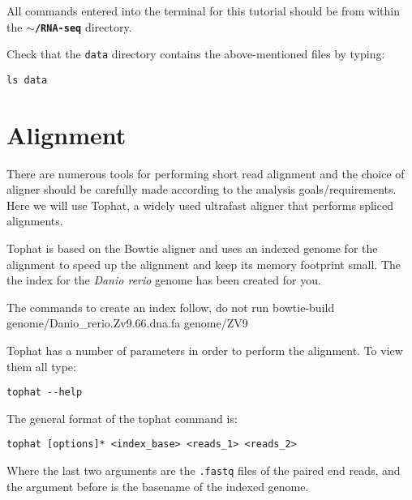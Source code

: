 \begin{warning}
  All commands entered into the terminal for this tutorial should be from within the
  \textbf{\texttt{$\sim$/RNA-seq}} directory.
\end{warning}

\begin{steps}
Check that the \texttt{data} directory contains the above-mentioned files by typing:
\begin{lstlisting}
ls data
\end{lstlisting}
\end{steps}

\section{Alignment}
There are numerous tools for performing short read alignment and the choice of aligner
should be carefully made according to the analysis goals/requirements. Here we will
use Tophat, a widely used ultrafast aligner that performs spliced alignments.

Tophat is based on the Bowtie aligner and uses an indexed genome for the
alignment to speed up the alignment and keep its memory footprint small. 
The the index for the \textit{Danio rerio} genome has been created for you. 

\begin{warning}
The commands to create an index follow, do not run
bowtie-build genome/Danio_rerio.Zv9.66.dna.fa genome/ZV9
\end{warning}

\begin{steps}
Tophat has a number of parameters in order to perform the alignment. To view them all type:
\begin{lstlisting}
tophat --help
\end{lstlisting}
\end{steps}

\begin{information}
The general format of the tophat command is:
\begin{lstlisting}[style=command_syntax]
tophat [options]* <index_base> <reads_1> <reads_2>
\end{lstlisting}

Where the last two arguments are the \texttt{.fastq} files of the paired end
reads, and the argument before is the basename of the indexed genome.
\end{information}

